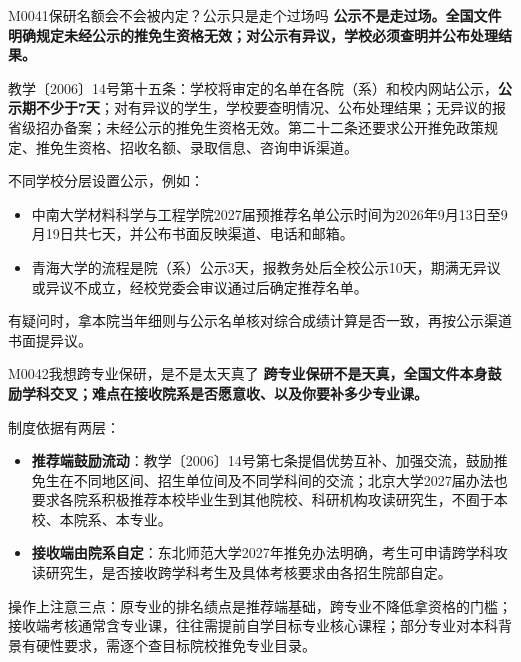 \begin{qa}{M0041}{保研名额会不会被内定？公示只是走个过场吗}
\textbf{公示不是走过场。全国文件明确规定未经公示的推免生资格无效；对公示有异议，学校必须查明并公布处理结果。}

教学〔2006〕14号第十五条：学校将审定的名单在各院（系）和校内网站公示，\textbf{公示期不少于7天}；对有异议的学生，学校要查明情况、公布处理结果；无异议的报省级招办备案；未经公示的推免生资格无效。第二十二条还要求公开推免政策规定、推免生资格、招收名额、录取信息、咨询申诉渠道。

不同学校分层设置公示，例如：

\begin{itemize}
  \item 中南大学材料科学与工程学院2027届预推荐名单公示时间为2026年9月13日至9月19日共七天，并公布书面反映渠道、电话和邮箱。
  \item 青海大学的流程是院（系）公示3天，报教务处后全校公示10天，期满无异议或异议不成立，经校党委会审议通过后确定推荐名单。
\end{itemize}

有疑问时，拿本院当年细则与公示名单核对综合成绩计算是否一致，再按公示渠道书面提异议。
\end{qa}

\begin{qa}{M0042}{我想跨专业保研，是不是太天真了}
\textbf{跨专业保研不是天真，全国文件本身鼓励学科交叉；难点在接收院系是否愿意收、以及你要补多少专业课。}

制度依据有两层：

\begin{itemize}
  \item \textbf{推荐端鼓励流动}：教学〔2006〕14号第七条提倡优势互补、加强交流，鼓励推免生在不同地区间、招生单位间及不同学科间的交流；北京大学2027届办法也要求各院系积极推荐本校毕业生到其他院校、科研机构攻读研究生，不囿于本校、本院系、本专业。
  \item \textbf{接收端由院系自定}：东北师范大学2027年推免办法明确，考生可申请跨学科攻读研究生，是否接收跨学科考生及具体考核要求由各招生院部自定。
\end{itemize}

操作上注意三点：原专业的排名绩点是推荐端基础，跨专业不降低拿资格的门槛；接收端考核通常含专业课，往往需提前自学目标专业核心课程；部分专业对本科背景有硬性要求，需逐个查目标院校推免专业目录。
\end{qa}

